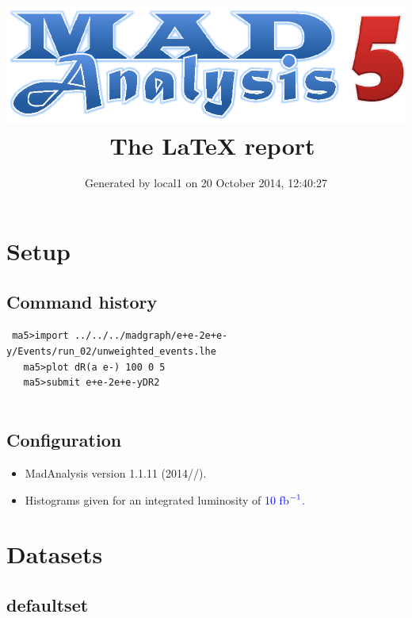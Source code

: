 \documentclass[a4paper, 11pt]{article}
\title{{\includegraphics[scale=.4]{logo.eps}}\ The LaTeX report}
\author{Generated by local1 on 20 October 2014, 12:40:27}
\begin{document}
\maketitle
\flushbottom

\newpage
\section{ Setup}

\subsection{ Command history}

\texttt{ ma5>import ../\-../\-../\-madgraph/\-e+e-2e+e-y/\-Events/\-run\_02/\-unweighted\_events.lhe\\
}
\texttt{ }\texttt{ }\texttt{ ma5>plot dR(a e-) 100 0 5 \\
}
\texttt{ }\texttt{ }\texttt{ ma5>submit e+e-2e+e-yDR2\\
}
\texttt{ }\texttt{ }\subsection{ Configuration}

\begin{itemize}
  \item MadAnalysis version 1.1.11 (2014//).
   \item Histograms given for an integrated luminosity of \textcolor{blue}{10}\textcolor{blue}{ fb}$^{\textcolor{blue}{-1}}$\textcolor{blue}{.}
\textcolor{blue}{}
\end{itemize}
\newpage
\section{ Datasets}

\subsection{ defaultset}
\end{document}
